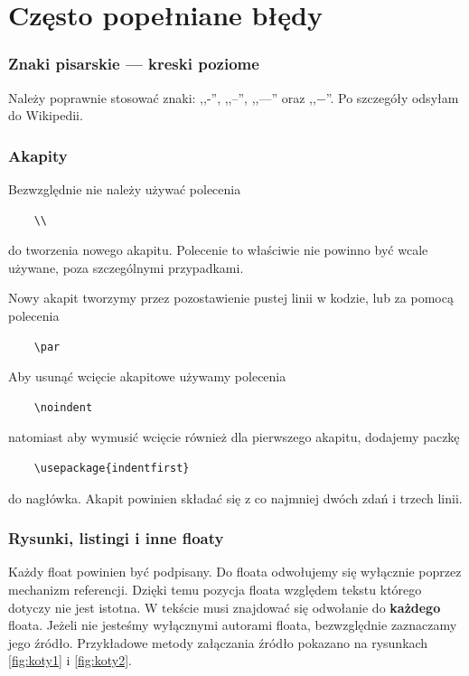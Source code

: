 \chapter{Często popełniane błędy}

\subsection*{Znaki pisarskie --- kreski poziome}

Należy poprawnie stosować znaki: ,,-'', ,,--'', ,,---'' oraz ,,$-$''. Po szczegóły odsyłam do Wikipedii.

\subsection*{Akapity}

Bezwzględnie nie należy używać polecenia
\begin{verbatim}
    \\
\end{verbatim}
do tworzenia nowego akapitu. Polecenie to właściwie nie powinno być wcale używane, poza szczególnymi przypadkami.

Nowy akapit tworzymy przez pozostawienie pustej linii w kodzie, lub za pomocą polecenia
\begin{verbatim}
    \par
\end{verbatim}
Aby usunąć wcięcie akapitowe używamy polecenia
\begin{verbatim}
    \noindent
\end{verbatim}
natomiast aby wymusić wcięcie również dla pierwszego akapitu, dodajemy paczkę
\begin{verbatim}
    \usepackage{indentfirst}
\end{verbatim}
do nagłówka.
Akapit powinien składać się z co najmniej dwóch zdań i trzech linii.

\subsection*{Rysunki, listingi i inne floaty}

Każdy float powinien być podpisany. Do floata odwołujemy się wyłącznie poprzez mechanizm referencji. Dzięki temu pozycja floata względem tekstu którego dotyczy nie jest istotna. W tekście musi znajdować się odwołanie do \textbf{każdego} floata. Jeżeli nie jesteśmy wyłącznymi autorami floata, bezwzględnie zaznaczamy jego źródło. Przykładowe metody załączania źródło pokazano na rysunkach \ref{fig:koty1} i \ref{fig:koty2}.

